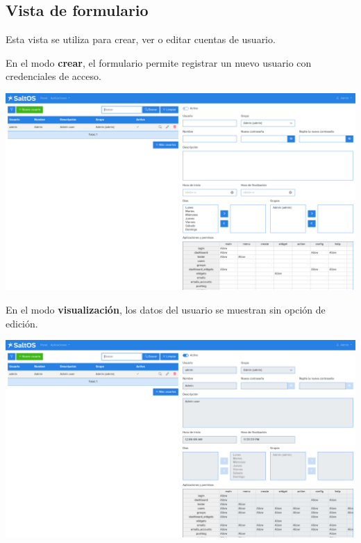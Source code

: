 \documentclass[a4paper]{article}
\begin{document}
\hypertarget{toc184}{}
\subsection{Vista de formulario}

Esta vista se utiliza para crear, ver o editar cuentas de usuario.

En el modo \textbf{crear}, el formulario permite registrar un nuevo usuario con credenciales de acceso.

\begin{center}\includegraphics[width=1\textwidth]{../ujest/snaps/test-screenshots-js-screenshots-users-users-create-es-es-1-snap.png}\end{center}

En el modo \textbf{visualización}, los datos del usuario se muestran sin opción de edición.

\begin{center}\includegraphics[width=1\textwidth]{../ujest/snaps/test-screenshots-js-screenshots-users-users-view-1-es-es-1-snap.png}\end{center}
\end{document}
